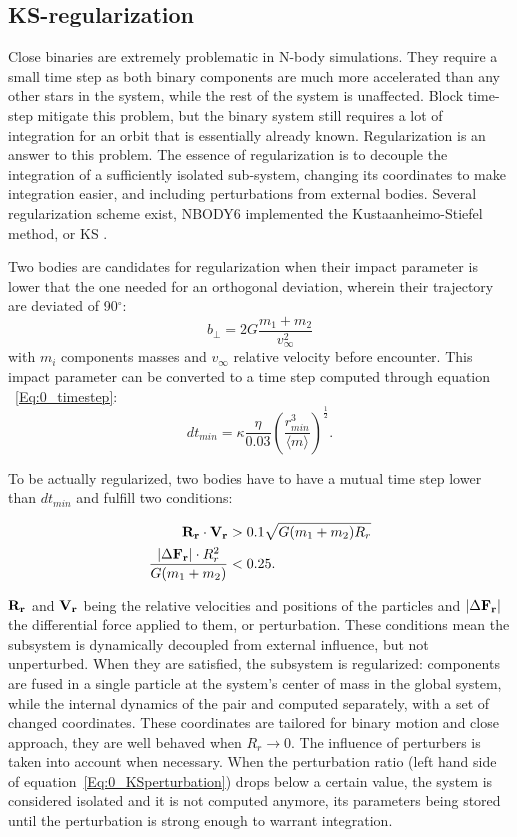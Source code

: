 
\subsection{KS-regularization}

Close binaries are extremely problematic in N-body simulations. They require a small time step as both binary components are much more accelerated than any other stars in the system, while the rest of the system is unaffected. Block time-step mitigate this problem, but the binary system still requires a lot of integration for an orbit that is essentially already known. Regularization is an answer to this problem. The essence of regularization is to decouple the integration of a sufficiently isolated sub-system, changing its coordinates to make integration easier, and including perturbations from external bodies. Several regularization scheme exist, NBODY6 implemented the Kustaanheimo-Stiefel method, or KS \citep{KS1965}.

Two bodies are candidates for regularization when their impact parameter is lower that the one needed for an orthogonal deviation, wherein their trajectory are deviated of 90$^\circ$:
\begin{equation}
b_\perp = 2G \frac{m_1 +m_2}{v^2_\infty}
\end{equation}
with $m_i$ components masses and $v_\infty$ relative velocity before encounter. This impact parameter can be converted to a time step computed through equation ~\ref{Eq:0_timestep}:
\begin{equation}
dt_{min} = \kappa \frac{\eta}{0.03} \left( \frac{r^3_{min}}{\langle m \rangle}\right)^\frac{1}{2}.
\end{equation}

To be actually regularized, two bodies have to have a mutual time step lower than $dt_{min}$ and fulfill two conditions:

\begin{align}
\bold{R_r} \cdot \bold{V_r} &> 0.1 \sqrt{ G(m_1+m_2)R_r}\\
\label{Eq:0_KSperturbation}
\frac{\left| \Delta \bold{F_r} \right| \cdot R^2_r}{G(m_1+m_2)} &< 0.25.
\end{align}

$\bold{R_r}$ and $\bold{V_r}$ being the relative velocities and positions of the particles and $\left| \Delta \bold{F_r} \right|$ the differential force applied to them, or perturbation. These conditions mean the subsystem is dynamically decoupled from external influence, but not unperturbed. When they are satisfied, the subsystem is regularized: components are fused in a single particle at the system's center of mass in the global system, while the internal dynamics of the pair and computed separately, with a set of changed coordinates. These coordinates are tailored for binary motion and close approach, they are well behaved when $R_r \rightarrow 0$. The influence of perturbers is taken into account when necessary. When the perturbation ratio (left hand side of equation~\ref{Eq:0_KSperturbation}) drops below a certain value, the system is considered isolated and it is not computed anymore, its parameters being stored until the perturbation is strong enough to warrant integration.

